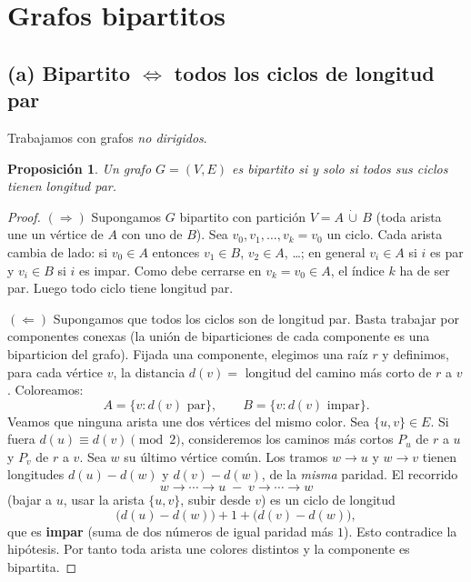 \documentclass[11pt,a4paper]{article}
\theoremstyle{plain}
\newtheorem{proposicion}{Proposici\'on}
\theoremstyle{definition}
\begin{document}
\section{Grafos bipartitos}

\subsection*{(a) Bipartito $\Leftrightarrow$ todos los ciclos de longitud par}

Trabajamos con grafos \emph{no dirigidos}.

\begin{proposicion}
Un grafo $G=(V,E)$ es bipartito si y solo si todos sus ciclos tienen longitud par.
\end{proposicion}

\begin{proof}
$(\Rightarrow)$ Supongamos $G$ bipartito con partici\'on $V=A\,\dot\cup\,B$ (toda
arista une un v\'ertice de $A$ con uno de $B$). Sea
$v_0,v_1,\dots,v_k=v_0$ un ciclo. Cada arista cambia de lado: si $v_0\in A$ entonces
$v_1\in B$, $v_2\in A$, \dots; en general $v_i\in A$ si $i$ es par y $v_i\in B$ si $i$
es impar. Como debe cerrarse en $v_k=v_0\in A$, el \'indice $k$ ha de ser par. Luego
todo ciclo tiene longitud par.

$(\Leftarrow)$ Supongamos que todos los ciclos son de longitud par. Basta trabajar
por componentes conexas (la uni\'on de biparticiones de cada componente es una
biparticion del grafo). Fijada una componente, elegimos una ra\'iz $r$ y
definimos, para cada v\'ertice $v$, la distancia $d(v)=$ longitud del camino m\'as
corto de $r$ a $v$. Coloreamos:
\[
A=\{v: d(v)\text{ par}\},\qquad B=\{v: d(v)\text{ impar}\}.
\]
Veamos que ninguna arista une dos v\'ertices del mismo color. Sea $\{u,v\}\in E$.
Si fuera $d(u)\equiv d(v)\pmod 2$, considere\-mos los caminos m\'as cortos
$P_u$ de $r$ a $u$ y $P_v$ de $r$ a $v$. Sea $w$ su \'ultimo v\'ertice com\'un. Los
tramos $w\!\to\!u$ y $w\!\to\!v$ tienen longitudes $d(u)-d(w)$ y $d(v)-d(w)$, de la
\emph{misma} paridad. El recorrido
\[
w\to\cdots\to u \;-\; v\to\cdots\to w
\]
(bajar a $u$, usar la arista $\{u,v\}$, subir desde $v$) es un ciclo de longitud
\[
\big(d(u)-d(w)\big) + 1 + \big(d(v)-d(w)\big),
\]
que es \textbf{impar} (suma de dos n\'umeros de igual paridad m\'as $1$). Esto
contradice la hip\'otesis. Por tanto toda arista une colores distintos y la
componente es bipartita.
\end{proof}
\end{document}
